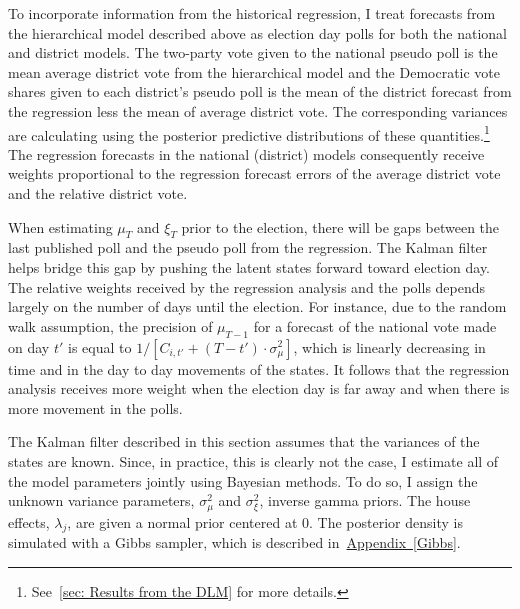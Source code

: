 \documentclass[12pt,final,fleqn]{article}
\newcommand{\aref}[1]{\hyperref[#1]{Appendix~\ref{#1}}}
\theoremstyle{plain}
\begin{document}
To incorporate information from the historical regression, I treat forecasts from the hierarchical model described above as election day polls for both the national and district models. The two-party vote given to the national pseudo poll is the mean average district vote from the hierarchical model and the Democratic vote shares given to each district's pseudo poll is the mean of the district forecast from the regression less the mean of average district vote. The corresponding variances are calculating using the posterior predictive distributions of these quantities.\footnote{See~\autoref{sec: Results from the DLM} for more details.} The regression forecasts in the national (district) models consequently receive weights proportional to the regression forecast errors of the average district vote and the relative district vote. 

When estimating $\mu_T$ and $\xi_T$ prior to the election, there will be gaps between the last published poll and the pseudo poll from the regression. The Kalman filter helps bridge this gap by pushing the latent states forward toward election day. The relative weights received by the regression analysis and the polls depends largely on the number of days until the election. For instance, due to the random walk assumption, the precision of $\mu_{T-1}$ for a forecast of the national vote made on day $t'$ is equal to $1/\left[C_{i,t'} + (T-t')\cdot \sigma^2_\mu\right]$, which is linearly decreasing in time and in the day to day movements of the states. It follows that the regression analysis receives more weight when the election day is far away and when there is more movement in the polls.  

The Kalman filter described in this section assumes that the variances of the states are known. Since, in practice, this is clearly not the case, I estimate all of the model parameters jointly using Bayesian methods. To do so, I assign the unknown variance parameters, $\sigma_\mu^2$ and $\sigma_\xi^2$, inverse gamma priors. The house effects, $\lambda_j$, are given a normal prior centered at $0$. The posterior density is simulated with a Gibbs sampler, which is described in~\aref{Gibbs}.
\end{document}
